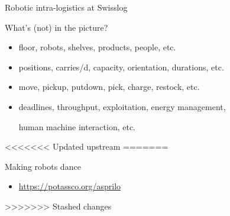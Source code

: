 \begin{frame}[c]{Robotic intra-logistics at Swisslog}
  \begin{center}
  \end{center}
\end{frame}
\begin{frame}{What's (not) in the picture?}
  \bigskip
  \begin{itemize}
  \item {}

    floor,
    robots,
    shelves,
    products,
    people,
    etc.
    \medskip
  \item {}

    positions,
    carries/d,
    capacity,
    orientation,
    durations,
    etc.
    \medskip
  \item {}

    move,
    pickup,
    putdown,
    pick,
    charge,
    restock,
    etc.
    \medskip
  \item {}

    deadlines,
    throughput,
    exploitation,
    energy management,\par
    human machine interaction,
    etc.
  \end{itemize}
  \bigskip
\end{frame}
<<<<<<< Updated upstream
=======
\begin{frame}[c]{Making robots dance}
  \begin{center}%
  \end{center}
  \begin{itemize}
  \item {} \url{https://potassco.org/asprilo}
  \end{itemize}
\end{frame}
>>>>>>> Stashed changes
%

